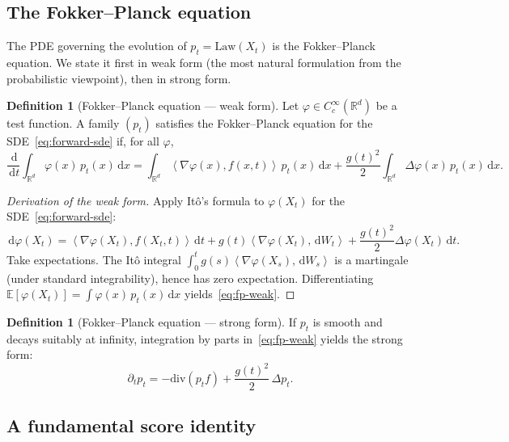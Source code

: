 \documentclass[11pt]{article}
\newcommand{\R}{\mathbb{R}}
\newcommand{\E}{\mathbb{E}}
\newcommand{\grad}{\nabla}
\newcommand{\diver}{\mathrm{div}}
\newcommand{\inner}[2]{\left\langle #1,#2 \right\rangle}
\newcommand{\dd}{\,\mathrm{d}}
\newcommand{\law}{\mathrm{Law}}
\theoremstyle{definition}
\newtheorem{definition}[theorem]{Definition}
\theoremstyle{remark}
\begin{document}
\subsection{The Fokker--Planck equation}\label{subsec:fp}

The PDE governing the evolution of $p_t = \law(X_t)$ is the Fokker--Planck equation.
We state it first in weak form (the most natural formulation from the probabilistic viewpoint), then in strong form.

\begin{definition}[Fokker--Planck equation --- weak form]\label{def:fp-weak}
Let $\varphi \in C_c^\infty(\R^d)$ be a test function.
A family $(p_t)$ satisfies the Fokker--Planck equation for the SDE~\eqref{eq:forward-sde} if, for all $\varphi$,
\begin{equation}\label{eq:fp-weak}
\frac{\dd}{\dd t}\int_{\R^d} \varphi(x)\,p_t(x)\dd x
=
\int_{\R^d} \inner{\grad\varphi(x)}{f(x,t)}\,p_t(x)\dd x
+ \frac{g(t)^2}{2}\int_{\R^d} \Delta\varphi(x)\,p_t(x)\dd x.
\end{equation}
\end{definition}

\begin{proof}[Derivation of the weak form]
Apply It\^o's formula to $\varphi(X_t)$ for the SDE~\eqref{eq:forward-sde}:
\[
\dd\varphi(X_t) = \inner{\grad\varphi(X_t)}{f(X_t,t)}\dd t + g(t)\inner{\grad\varphi(X_t)}{\dd W_t} + \frac{g(t)^2}{2}\Delta\varphi(X_t)\dd t.
\]
Take expectations.
The It\^o integral $\int_0^t g(s)\inner{\grad\varphi(X_s)}{\dd W_s}$ is a martingale (under standard integrability), hence has zero expectation.
Differentiating $\E[\varphi(X_t)] = \int \varphi(x)\,p_t(x)\dd x$ yields~\eqref{eq:fp-weak}.
\end{proof}

\begin{definition}[Fokker--Planck equation --- strong form]\label{def:fp-strong}
If $p_t$ is smooth and decays suitably at infinity, integration by parts in~\eqref{eq:fp-weak} yields the strong form:
\begin{equation}\label{eq:fp-strong}
\partial_t p_t = -\diver(p_t f) + \frac{g(t)^2}{2}\,\Delta p_t.
\end{equation}
\end{definition}

\subsection{A fundamental score identity}\label{subsec:score-id}
\end{document}
